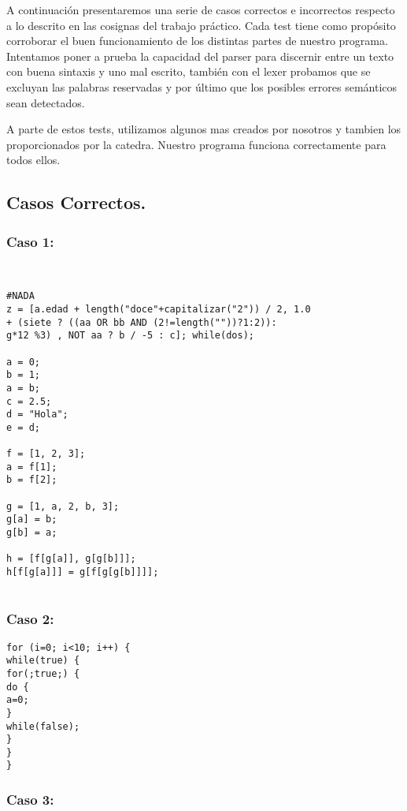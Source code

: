 A continuación presentaremos una serie de casos correctos e incorrectos respecto a lo descrito en las cosignas del trabajo práctico. Cada test tiene como propósito corroborar el buen funcionamiento de los distintas partes de nuestro programa. Intentamos poner a prueba la capacidad del parser para discernir entre un texto con buena sintaxis y uno mal escrito, también con el lexer probamos que se excluyan las palabras reservadas y por último que los posibles errores semánticos sean detectados.

A parte de estos tests, utilizamos algunos mas creados por nosotros y tambien los proporcionados por la catedra. Nuestro programa funciona correctamente para todos ellos.

\subsection{Casos Correctos.}
\subsubsection{Caso 1:}

\begin{verbatim}


#NADA
z = [a.edad + length("doce"+capitalizar("2")) / 2, 1.0 
+ (siete ? ((aa OR bb AND (2!=length(""))?1:2)):
g*12 %3) , NOT aa ? b / -5 : c]; while(dos);

a = 0;
b = 1;
a = b;
c = 2.5;
d = "Hola";
e = d;

f = [1, 2, 3];
a = f[1];
b = f[2];

g = [1, a, 2, b, 3];
g[a] = b;
g[b] = a;

h = [f[g[a]], g[g[b]]];
h[f[g[a]]] = g[f[g[g[b]]]];


\end{verbatim}

\subsubsection{Caso 2:}

\begin{verbatim}
for (i=0; i<10; i++) {
while(true) {
for(;true;) {
do {
a=0;
}
while(false);
}
}
}

\end{verbatim}

\subsubsection{Caso 3:}

